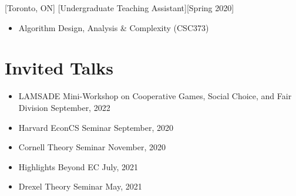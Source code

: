 \documentclass{article}
\begin{document}
    [Toronto, ON]
    [Undergraduate Teaching Assistant][Spring 2020]
    \begin{itemize}
        \item Algorithm Design, Analysis \& Complexity (CSC373)
    \end{itemize}
    
    \section{Invited Talks}
    \begin{itemize}
    	\item LAMSADE Mini-Workshop on Cooperative Games, Social Choice, and Fair Division \hfill September, 2022
    \end{itemize}
    \begin{itemize}
    	\item Harvard EconCS Seminar \hfill September, 2020
    	\item Cornell Theory Seminar \hfill November, 2020
    	\item Highlights Beyond EC \hfill July, 2021
    \end{itemize}
    
    \begin{itemize}
    	\item Drexel Theory Seminar \hfill May, 2021
    \end{itemize}
    
    
\end{document}
